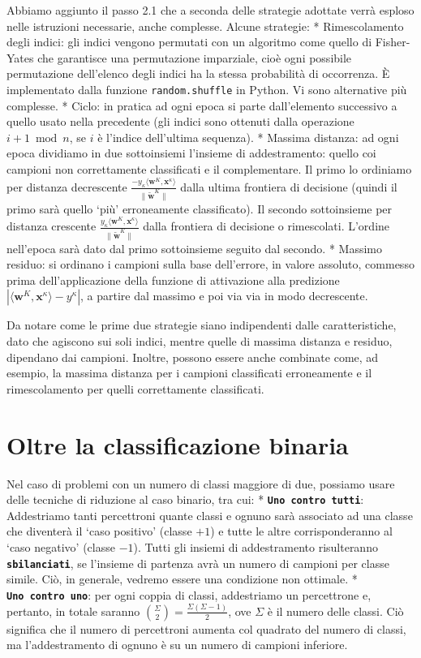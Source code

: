 \documentclass[
  letterpaper,
  DIV=11,
  numbers=noendperiod]{scrreprt}
\begin{document}
Abbiamo aggiunto il passo 2.1 che a seconda delle strategie adottate
verrà esploso nelle istruzioni necessarie, anche complesse. Alcune
strategie: * Rimescolamento degli indici: gli indici vengono permutati
con un algoritmo come quello di Fisher-Yates che garantisce una
permutazione imparziale, cioè ogni possibile permutazione dell'elenco
degli indici ha la stessa probabilità di occorrenza. È implementato
dalla funzione \texttt{random.shuffle} in Python. Vi sono alternative
più complesse. * Ciclo: in pratica ad ogni epoca si parte dall'elemento
successivo a quello usato nella precedente (gli indici sono ottenuti
dalla operazione \(i+1 \bmod n\), se \(i\) è l'indice dell'ultima
sequenza). * Massima distanza: ad ogni epoca dividiamo in due
sottoinsiemi l'insieme di addestramento: quello coi campioni non
correttamente classificati e il complementare. Il primo lo ordiniamo per
distanza decrescente
\(\frac{-y_\kappa\langle\mathbf{w}^K, \mathbf{x}^\kappa\rangle}{\lVert\widetilde{\mathbf{w}}^K\rVert}\)
dalla ultima frontiera di decisione (quindi il primo sarà quello `più'
erroneamente classificato). Il secondo sottoinsieme per distanza
crescente
\(\frac{y_\kappa\langle\mathbf{w}^K, \mathbf{x}^\kappa\rangle}{\lVert\widetilde{\mathbf{w}}^K\rVert}\)
dalla frontiera di decisione o rimescolati. L'ordine nell'epoca sarà
dato dal primo sottoinsieme seguito dal secondo. * Massimo residuo: si
ordinano i campioni sulla base dell'errore, in valore assoluto, commesso
prima dell'applicazione della funzione di attivazione alla predizione
\(|\langle\mathbf{w}^K,\mathbf{x}^\kappa\rangle-y^\kappa|\), a partire
dal massimo e poi via via in modo decrescente.

Da notare come le prime due strategie siano indipendenti dalle
caratteristiche, dato che agiscono sui soli indici, mentre quelle di
massima distanza e residuo, dipendano dai campioni. Inoltre, possono
essere anche combinate come, ad esempio, la massima distanza per i
campioni classificati erroneamente e il rimescolamento per quelli
correttamente classificati.

\section{Oltre la classificazione
binaria}\label{oltre-la-classificazione-binaria}

Nel caso di problemi con un numero di classi maggiore di due, possiamo
usare delle tecniche di riduzione al caso binario, tra cui: *
\textbf{\texttt{Uno\ contro\ tutti}}: Addestriamo tanti percettroni
quante classi e ognuno sarà associato ad una classe che diventerà il
`caso positivo' (classe \(+1\)) e tutte le altre corrisponderanno al
`caso negativo' (classe \(-1\)). Tutti gli insiemi di addestramento
risulteranno \textbf{\texttt{sbilanciati}}, se l'insieme di partenza
avrà un numero di campioni per classe simile. Ciò, in generale, vedremo
essere una condizione non ottimale. *
\textbf{\texttt{Uno\ contro\ uno}}: per ogni coppia di classi,
addestriamo un percettrone e, pertanto, in totale saranno
\(\binom{\Sigma}{2}=\frac{\Sigma(\Sigma-1)}{2}\), ove \(\Sigma\) è il
numero delle classi. Ciò significa che il numero di percettroni aumenta
col quadrato del numero di classi, ma l'addestramento di ognuno è su un
numero di campioni inferiore.
\end{document}
